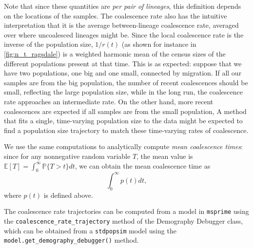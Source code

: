 \documentclass[12pt,halfline,a4paper]{ouparticle}
\newcommand{\stdpopsim}{\texttt{stdpopsim}\xspace}
\begin{document}
Note that since these quantities are \emph{per pair of lineages},
this definition depends on the locations of the samples.
The coalescence rate also has the intuitive interpretation that
it is the average between-lineage coalescence rate,
averaged over where uncoalesced lineages might be.
Since the local coalescence rate is the inverse of the population size,
$1/r(t)$ (as shown for instance in \autoref{fig:n_t_ragsdale})
is a weighted harmonic mean of the census sizes of the different populations present at that time.
This is as expected: suppose that we have two populations, one big and one small,
connected by migration.
If all our samples are from the big population,
the number of recent coalescences should be small, reflecting the large population size,
while in the long run, the coalescence rate approaches an intermediate rate.
On the other hand, more recent coalescences are expected
if all samples are from the small population,
A method that fits a single, time-varying population size to the data
might be expected to find a population size trajectory
to match these time-varying rates of coalescence.

We use the same computations to analytically compute \emph{mean coalescence times}:
since for any nonnegative random variable $T$, the mean value is
$\mathbb{E}[T] = \int_0^\infty \mathbb{P}\{T > t\} dt$,
we can obtain the mean coalescence time as
$$
\int_0^\infty p(t) dt ,
$$
where $p(t)$ is defined above.

The coalescence rate trajectories can be computed from a model in \texttt{msprime}
using the \texttt{coalescence\_rate\_trajectory} method of the Demography Debugger class,
which can be obtained from a \stdpopsim model using the
\texttt{model.get\_demography\_debugger()} method.
\end{document}
